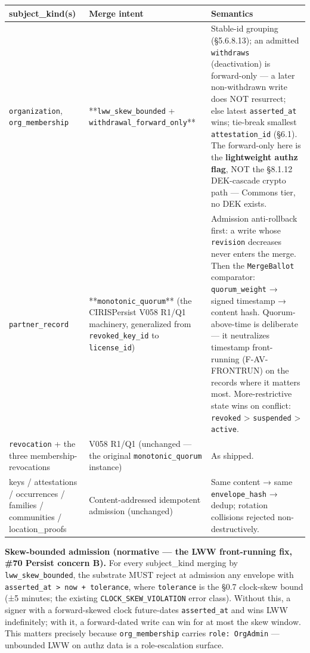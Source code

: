 \documentclass[10pt]{article}
\begin{document}
{\footnotesize
\begin{longtable}{|p{5.33cm}|p{5.33cm}|p{5.33cm}|}\hline
\textbf{subject\_kind(s)} & \textbf{Merge intent} & \textbf{Semantics} \\ \hline\endhead
\texttt{organization}, \texttt{org\_membership} & **\texttt{lww\_skew\_bounded} + \texttt{withdrawal\_forward\_only}** & Stable-id grouping (§5.6.8.13); an admitted \texttt{withdraws} (deactivation) is forward-only — a later non-withdrawn write does NOT resurrect; else latest \texttt{asserted\_at} wins; tie-break smallest \texttt{attestation\_id} (§6.1). The forward-only here is the \textbf{lightweight authz flag}, NOT the §8.1.12 DEK-cascade crypto path — Commons tier, no DEK exists. \\ \hline
\texttt{partner\_record} & **\texttt{monotonic\_quorum}** (the CIRISPersist V058 R1/Q1 machinery, generalized from \texttt{revoked\_key\_id} to \texttt{license\_id}) & Admission anti-rollback first: a write whose \texttt{revision} decreases never enters the merge. Then the \texttt{MergeBallot} comparator: \texttt{quorum\_weight} → signed timestamp → content hash. Quorum-above-time is deliberate — it neutralizes timestamp front-running (F-AV-FRONTRUN) on the records where it matters most. More-restrictive state wins on conflict: \texttt{revoked} > \texttt{suspended} > \texttt{active}. \\ \hline
\texttt{revocation} + the three membership-revocations & V058 R1/Q1 (unchanged — the original \texttt{monotonic\_quorum} instance) & As shipped. \\ \hline
keys / attestations / occurrences / families / communities / location\_proofs & Content-addressed idempotent admission (unchanged) & Same content → same \texttt{envelope\_hash} → dedup; rotation collisions rejected non-destructively. \\ \hline
\end{longtable}}


\textbf{Skew-bounded admission (normative — the LWW front-running fix, \#70 Persist concern B).} For every subject\_kind merging by \texttt{lww\_skew\_bounded}, the substrate MUST reject at admission any envelope with \texttt{asserted\_at > now + tolerance}, where \texttt{tolerance} is the §0.7 clock-skew bound (±5 minutes; the existing \texttt{CLOCK\_SKEW\_VIOLATION} error class). Without this, a signer with a forward-skewed clock future-dates \texttt{asserted\_at} and wins LWW indefinitely; with it, a forward-dated write can win for at most the skew window. This matters precisely because \texttt{org\_membership} carries \texttt{role: OrgAdmin} — unbounded LWW on authz data is a role-escalation surface.
\end{document}
